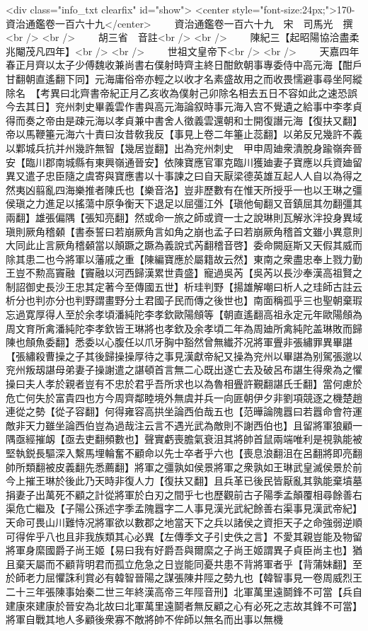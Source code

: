 <div class="info_txt clearfix" id="show">
<center style="font-size:24px;">170-資治通鑑卷一百六十九</center>
  　　資治通鑑卷一百六十九　宋　司馬光　撰<br />
<br />
　　胡三省　音註<br />
<br />
　　陳紀三【起昭陽協洽盡柔兆閹茂凡四年】<br />
<br />
　　世祖文皇帝下<br />
<br />
　　天嘉四年春正月齊以太子少傅魏收兼尚書右僕射時齊主終日酣飲朝事專委侍中高元海【酣戶甘翻朝直遙翻下同】元海庸俗帝亦輕之以收才名素盛故用之而收畏懦避事尋坐阿縱除名　【考異曰北齊書帝紀正月乙亥收為僕射己卯除名相去五日不容如此之速恐誤今去其日】兖州刺史畢義雲作書與高元海論叙時事元海入宫不覺遺之給事中李孝貞得而奏之帝由是疎元海以孝貞兼中書舍人徵義雲還朝和士開復譖元海【復扶又翻】帝以馬鞭箠元海六十責曰汝昔敎我反【事見上卷二年箠止蕊翻】以弟反兄幾許不義以鄴城兵抗并州幾許無智【幾居豈翻】出為兖州刺史　甲申周廸衆潰脫身踰嶺奔晉安【臨川郡南城縣有東興嶺通晉安】依陳寶應官軍克臨川獲廸妻子寶應以兵資廸留異又遣子忠臣隨之虞寄與寶應書以十事諫之曰自天厭梁德英雄互起人人自以為得之然夷凶翦亂四海樂推者陳氏也【樂音洛】豈非歷數有在惟天所授乎一也以王琳之彊侯瑱之力進足以搖蕩中原争衡天下退足以屈彊江外【瑱他甸翻又音鎮屈其勿翻彊其兩翻】雄張偏隅【張知亮翻】然或命一旅之師或資一士之說琳則瓦解氷泮投身異域瑱則厥角稽顙【書泰誓曰若崩厥角言如角之崩也孟子曰若崩厥角稽首文雖小異意則大同此止言厥角稽顙當以顛蹶之蹶為義說式芮翻稽音啓】委命闕庭斯又天假其威而除其患二也今將軍以藩戚之重【陳編寶應於屬籍故云然】東南之衆盡忠奉上戮力勤王豈不勲高竇融【竇融以河西歸漢累世貴盛】寵過吳芮【吳芮以長沙奉漢高祖賢之制詔御史長沙王忠其定著今至傳國五世】析珪判野【揚雄解嘲曰析人之珪師古註云析分也判亦分也判野謂畫野分土君國子民而傳之後世也】南面稱孤乎三也聖朝棄瑕忘過寛厚得人至於余孝頃潘純陀李孝欽歐陽頠等【朝直遙翻高祖永定元年歐陽頠為周文育所禽潘純陀李孝欽皆王琳將也孝欽及余孝頃二年為周廸所禽純陀盖琳敗而歸陳也頠魚委翻】悉委以心腹任以爪牙胸中豁然曾無纎芥况將軍舋非張繡罪異畢諶【張繡殺曹操之子其後歸操操厚待之事見漢獻帝紀又操為兖州以畢諶為别駕張邈以兖州叛刼諶母弟妻子操謝遣之諶頓首言無二心既出遂亡去及破呂布諶生得衆為之懼操曰夫人孝於親者豈有不忠於君乎吾所求也以為魯相舋許覲翻諶氏壬翻】當何慮於危亡何失於富貴四也方今周齊鄰睦境外無虞并兵一向匪朝伊夕非劉項競逐之機楚趙連從之勢【從子容翻】何得雍容高拱坐論西伯哉五也【范曄論隗囂曰若囂命會符運敵非天力雖坐論西伯豈為過哉注云言不遇光武為敵則不謝西伯也】且留將軍狼顧一隅亟經摧衂【亟去吏翻頻數也】聲實虧喪膽氣衰沮其將帥首鼠兩端唯利是視孰能被堅執鋭長驅深入繫馬埋輪奮不顧命以先士卒者乎六也【喪息浪翻沮在呂翻將即亮翻帥所類翻被皮義翻先悉薦翻】將軍之彊孰如侯景將軍之衆孰如王琳武皇滅侯景於前今上摧王琳於後此乃天時非復人力【復扶又翻】且兵革已後民皆厭亂其孰能棄墳墓捐妻子出萬死不顧之計從將軍於白刃之間乎七也歷觀前古子陽季孟顛覆相尋餘善右渠危亡繼及【子陽公孫述字季孟隗囂字二人事見漢光武紀餘善右渠事見漢武帝紀】天命可畏山川難恃况將軍欲以數郡之地當天下之兵以諸侯之資拒天子之命強弱逆順可得侔乎八也且非我族類其心必異【左傳季文子引史佚之言】不愛其親豈能及物留將軍身縻國爵子尚王姬【易曰我有好爵吾與爾縻之子尚王姬謂異子貞臣尚主也】猶且棄天屬而不顧背明君而孤立危急之日豈能同憂共患不背將軍者乎【背蒲妹翻】至於師老力屈懼誅利賞必有韓智晉陽之謀張陳井陘之勢九也【韓智事見一卷周威烈王二十三年張陳事始秦二世三年終漢高帝三年陘音刑】北軍萬里遠鬬鋒不可當【兵自建康來建康於晉安為北故曰北軍萬里遠鬬者無反顧之心有必死之志故其鋒不可當】將軍自戰其地人多顧後衆寡不敵將帥不侔師以無名而出事以無機